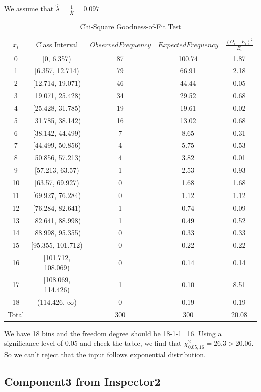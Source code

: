 \documentclass{article}
\begin{document}
We assume that $\hat{\lambda}=\frac{1}{\bar{X}}=0.097$
\begin{table}[htp]
\caption{Chi-Square Goodness-of-Fit Test}
\begin{center}
\begin{tabular}{ccccc}
\hline
$x_i$ & Class Interval & $Observed Frequency$ & $Expected Frequency$ & $\frac{(O_i-E_i)^2}{E_i}$\\
0& [0, 6.357)&87&100.74&1.87\\
1& [6.357, 12.714)&79&66.91&2.18\\
2&[12.714, 19.071)&46&44.44&0.05\\
3& [19.071, 25.428)&34&29.52&0.68\\
4&[25.428, 31.785)&19&19.61&0.02\\
5&[31.785, 38.142)&16&13.02&0.68\\
6&[38.142, 44.499)&7&8.65&0.31\\
7&[44.499, 50.856)&4&5.75&0.53\\
8&[50.856, 57.213)&4&3.82&0.01\\
9&[57.213, 63.57)&1&2.53&0.93\\
10&[63.57, 69.927)&0&1.68&1.68\\
11&[69.927, 76.284)&0&1.12&1.12\\
12&[76.284, 82.641)&1&0.74&0.09\\
13&[82.641, 88.998)&1&0.49&0.52\\
14&[88.998, 95.355)&0&0.33&0.33\\
15&[95.355, 101.712)&0&0.22&0.22\\
16&[101.712, 108.069)&0&0.14&0.14\\
17&[108.069, 114.426)&1&0.10&8.51\\
18& (114.426, $\infty$)&0&0.19&0.19\\
\hline
Total& &300&300&20.08\\

\hline

\end{tabular}
\end{center}
\label{default}
\end{table}%

We have 18 bins and the freedom degree should be 18-1-1=16. Using a significance level of 0.05 and check the table, we find that $\chi^2_{0.05, 16}=26.3 > 20.06$. So we can't reject that the input follows exponential distribution.

\subsection{Component3 from Inspector2}
\end{document}
